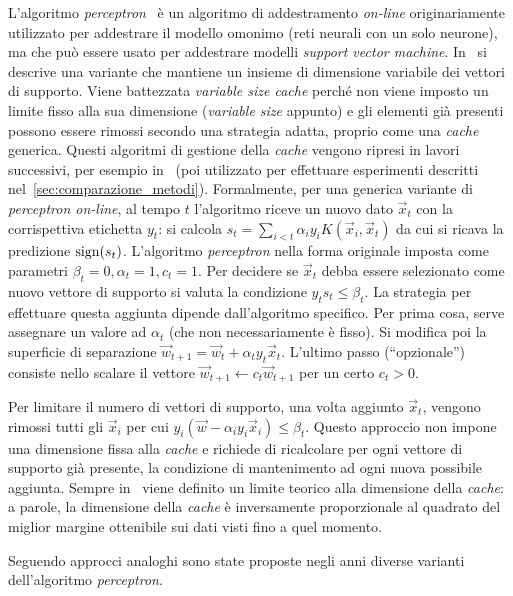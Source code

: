L'algoritmo \emph{perceptron}~\cite{1958_perceptron} è un algoritmo di addestramento \emph{on-line} originariamente utilizzato per addestrare il modello omonimo (reti neurali con un solo neurone), ma che può essere usato per addestrare modelli \emph{support vector machine}.
In~\cite{2003_online_classification_on_a_budget} si descrive una variante che mantiene un insieme di dimensione variabile dei vettori di supporto. 
Viene battezzata \emph{variable size cache} perché non viene imposto un limite fisso alla sua dimensione (\emph{variable size} appunto) e gli elementi già presenti possono essere rimossi secondo una strategia adatta, proprio come una \emph{cache} generica. 
Questi algoritmi di gestione della \emph{cache} vengono ripresi in lavori successivi, per esempio in~\cite{2012_bsgd} (poi utilizzato per effettuare esperimenti descritti nel~\cref{sec:comparazione_metodi}).
Formalmente, per una generica variante di \emph{perceptron on-line}, al tempo $t$ l'algoritmo riceve un nuovo dato $\Vec{x}_t$ con la corrispettiva etichetta $y_t$: si calcola $s_t = \sum_{i<t} \alpha_iy_iK(\Vec{x}_i, \Vec{x}_t)$ da cui si ricava la predizione $\mathrm{sign}(s_t)$. 
L'algoritmo \emph{perceptron} nella forma originale imposta come parametri $\beta_t=0, \alpha_t=1, c_t=1$. 
Per decidere se $\Vec{x}_t$ debba essere selezionato come nuovo vettore di supporto si valuta la condizione $y_ts_t \leq \beta_t$.
La strategia per effettuare questa aggiunta dipende dall'algoritmo specifico. 
Per prima cosa, serve assegnare un valore ad $\alpha_t$ (che non necessariamente è fisso). 
Si modifica poi la superficie di separazione $\Vec{w}_{t+1} = \Vec{w}_t + \alpha_ty_t\Vec{x}_t$. 
L'ultimo passo (``opzionale'') consiste nello scalare il vettore $\Vec{w}_{t+1} \leftarrow c_t\Vec{w}_{t+1}$ per un certo $c_t > 0$. 

Per limitare il numero di vettori di supporto, una volta aggiunto $\Vec{x}_t$, vengono rimossi tutti gli $\Vec{x}_i$ per cui $y_i(\Vec{w} - \alpha_iy_i\Vec{x}_i)\leq \beta_t$. 
Questo approccio non impone una dimensione fissa alla \emph{cache} e richiede di ricalcolare per ogni vettore di supporto già presente, la condizione di mantenimento ad ogni nuova possibile aggiunta. 
Sempre in~\cite{2003_online_classification_on_a_budget} viene definito un limite teorico alla dimensione della \emph{cache}: a parole, la dimensione della \emph{cache} è inversamente proporzionale al quadrato del miglior margine ottenibile sui dati visti fino a quel momento.

Seguendo approcci analoghi sono state proposte negli anni diverse varianti dell'algoritmo \emph{perceptron}.

